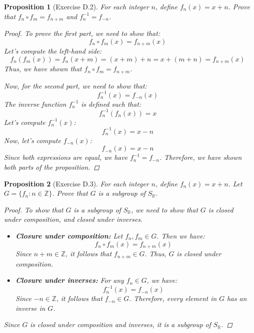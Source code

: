 \documentclass[12pt]{article}
\newcommand{\Z}{\mathbb{Z}} %
\newcommand{\R}{\mathbb{R}} %
\newtheorem{proposition}{Proposition}
\begin{document}
\begin{proposition}[Exercise D.2]
  For each integer $n$, define $f_n(x) = x + n$.
  Prove that $f_n \circ f_m = f_{n+m}$ and $f^{-1}_n = f_{-n}$.
  \begin{proof}
    To prove the first part, we need to show that:
    \[
      f_n \circ f_m(x) = f_{n+m}(x)
    \]
    Let's compute the left-hand side:
    \[
      f_n(f_m(x)) = f_n(x + m) = (x + m) + n = x + (m + n) = f_{n+m}(x)
    \]
    Thus, we have shown that $f_n \circ f_m = f_{n+m}$.

    Now, for the second part, we need to show that:
    \[
      f^{-1}_n(x) = f_{-n}(x)
    \]
    The inverse function $f^{-1}_n$ is defined such that:
    \[
      f^{-1}_n(f_n(x)) = x
    \]
    Let's compute $f^{-1}_n(x)$:
    \[
      f^{-1}_n(x) = x - n
    \]
    Now, let's compute $f_{-n}(x)$:
    \[
      f_{-n}(x) = x - n
    \]
    Since both expressions are equal, we have $f^{-1}_n = f_{-n}$.
    Therefore, we have shown both parts of the proposition.
  \end{proof}
\end{proposition}


\begin{proposition}[Exercise D.3]
  For each integer $n$, define $f_n(x) = x + n$.
  Let $G = \{f_n : n \in \Z\}$. Prove that $G$ is a subgroup of $S_{\R}$.
  \begin{proof}
    To show that $G$ is a subgroup of $S_{\R}$, we need to show that $G$ is
    closed under composition, and closed under inverses.
    \begin{itemize}
      \item \textbf{Closure under composition:} Let $f_n, f_m \in G$.
            Then we have:
            \[
              f_n \circ f_m(x) = f_{n+m}(x)
            \]
            Since $n + m \in \Z$, it follows that $f_{n+m} \in G$.
            Thus, $G$ is closed under composition.

      \item \textbf{Closure under inverses:} For any $f_n \in G$, we have:
            \[
              f^{-1}_n(x) = f_{-n}(x)
            \]
            Since $-n \in \Z$, it follows that $f_{-n} \in G$.
            Therefore, every element in $G$ has an inverse in $G$.
    \end{itemize}
    Since $G$ is closed under composition and inverses, it is a subgroup of $S_{\R}$.
  \end{proof}
\end{proposition}
\end{document}
